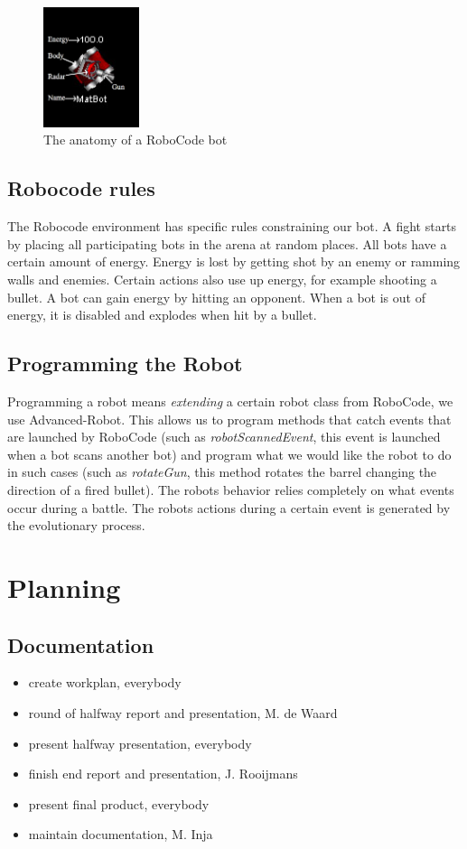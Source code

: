 \documentclass[a4paper,10pt]{article}
\begin{document}
\begin{figure}[h!]
    \centering
    \includegraphics[width=0.25\textwidth]{botatom}
    \caption{The anatomy of a RoboCode bot}
\end{figure} 

\subsection{Robocode rules}
The Robocode environment has specific rules constraining our bot. A fight starts by placing all participating bots in the arena at random places. All bots have a certain amount of energy. Energy is lost by getting shot by an enemy or ramming walls and enemies. Certain actions also use up energy, for example shooting a bullet.
A bot can gain energy by hitting an opponent.
When a bot is out of energy, it is disabled and explodes when hit by a bullet.

\subsection{Programming the Robot}
Programming a robot means \textit{extending} a certain robot class from RoboCode, we use Advanced-Robot. This allows us to program methods that catch events that are launched by RoboCode (such as \textit{robotScannedEvent}, this event is launched when a bot scans another bot) and program what we would like the robot to do in such cases (such as \textit{rotateGun}, this method rotates the barrel changing the direction of a fired bullet). The robots behavior relies completely on what events occur during a battle. The robots actions during a certain event is generated by the evolutionary process.

\newpage
\section{Planning}
\subsection{Documentation}
\begin{itemize}
 \item create workplan, everybody
 \item round of halfway report and presentation, M. de Waard
 \item present halfway presentation, everybody
 \item finish end report and presentation, J. Rooijmans
 \item present final product, everybody
 \item maintain documentation, M. Inja
\end{itemize}
\end{document}
